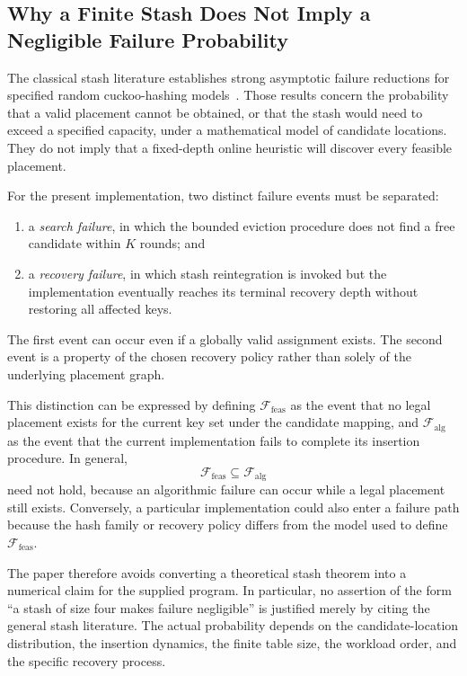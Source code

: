 \documentclass[conference]{IEEEtran}
\begin{document}
\subsection{Why a Finite Stash Does Not Imply a Negligible Failure Probability}

The classical stash literature establishes strong asymptotic failure reductions for specified random cuckoo-hashing models~\cite{kirsch2009stash,aumuller2014explicit,kutzelnigg2010stash}. Those results concern the probability that a valid placement cannot be obtained, or that the stash would need to exceed a specified capacity, under a mathematical model of candidate locations. They do not imply that a fixed-depth online heuristic will discover every feasible placement.

For the present implementation, two distinct failure events must be separated:
\begin{enumerate}
    \item a \emph{search failure}, in which the bounded eviction procedure does not find a free candidate within $K$ rounds; and
    \item a \emph{recovery failure}, in which stash reintegration is invoked but the implementation eventually reaches its terminal recovery depth without restoring all affected keys.
\end{enumerate}
The first event can occur even if a globally valid assignment exists. The second event is a property of the chosen recovery policy rather than solely of the underlying placement graph.

This distinction can be expressed by defining $\mathcal{F}_{\mathrm{feas}}$ as the event that no legal placement exists for the current key set under the candidate mapping, and $\mathcal{F}_{\mathrm{alg}}$ as the event that the current implementation fails to complete its insertion procedure. In general,
\begin{equation}
    \mathcal{F}_{\mathrm{feas}} \subseteq \mathcal{F}_{\mathrm{alg}}
\end{equation}
need not hold, because an algorithmic failure can occur while a legal placement still exists. Conversely, a particular implementation could also enter a failure path because the hash family or recovery policy differs from the model used to define $\mathcal{F}_{\mathrm{feas}}$.

The paper therefore avoids converting a theoretical stash theorem into a numerical claim for the supplied program. In particular, no assertion of the form ``a stash of size four makes failure negligible'' is justified merely by citing the general stash literature. The actual probability depends on the candidate-location distribution, the insertion dynamics, the finite table size, the workload order, and the specific recovery process.
\end{document}
